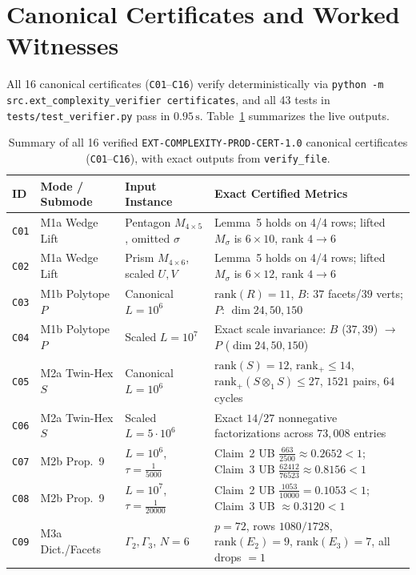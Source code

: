 \documentclass[10pt,twocolumn]{article}
\begin{document}
\section{Canonical Certificates and Worked Witnesses}
All 16 canonical certificates (\texttt{C01}--\texttt{C16}) verify deterministically via \nolinkurl{python -m src.ext_complexity_verifier certificates}, and all 43 tests in \nolinkurl{tests/test_verifier.py} pass in $0.95\,\mathrm{s}$. Table~\ref{tab:certs} summarizes the live outputs.

\begin{table}[t]
\centering
\scriptsize
\setlength{\tabcolsep}{4.0pt}
\caption{Summary of all 16 verified \texttt{EXT-COMPLEXITY-PROD-CERT-1.0} canonical certificates (\texttt{C01}--\texttt{C16}), with exact outputs from \texttt{verify\_file}.}
\label{tab:certs}
\begin{tabular}{@{}llll@{}}
\toprule
ID & Mode / Submode & Input Instance & Exact Certified Metrics \\
\midrule
\texttt{C01} & M1a Wedge Lift & Pentagon $M_{4\times 5}$, omitted $\sigma$ & Lemma~5 holds on 4/4 rows; lifted $M_\sigma$ is $6\times 10$, rank $4\to 6$ \\
\texttt{C02} & M1a Wedge Lift & Prism $M_{4\times 6}$, scaled $U,V$ & Lemma~5 holds on 4/4 rows; lifted $M_\sigma$ is $6\times 12$, rank $4\to 6$ \\
\texttt{C03} & M1b Polytope $P$ & Canonical $L=10^6$ & $\mathrm{rank}(R)=11$, $B$: $37$ facets/$39$ verts; $P$: $\dim 24, 50, 150$ \\
\texttt{C04} & M1b Polytope $P$ & Scaled $L=10^7$ & Exact scale invariance: $B$ ($37,39$) $\to$ $P$ ($\dim 24, 50, 150$) \\
\texttt{C05} & M2a Twin-Hex $S$ & Canonical $L=10^6$ & $\mathrm{rank}(S)=12$, $\mathrm{rank}_+\le 14$, $\mathrm{rank}_+(S\otimes_1 S)\le 27$, $1521$ pairs, $64$ cycles \\
\texttt{C06} & M2a Twin-Hex $S$ & Scaled $L=5\cdot 10^6$ & Exact $14$/$27$ nonnegative factorizations across $73{,}008$ entries \\
\texttt{C07} & M2b Prop.~9 & $L=10^6$, $\tau=\tfrac{1}{5000}$ & Claim~2 UB $\tfrac{663}{2500}\approx 0.2652<1$; Claim~3 UB $\tfrac{62412}{76523}\approx 0.8156<1$ \\
\texttt{C08} & M2b Prop.~9 & $L=10^7$, $\tau=\tfrac{1}{20000}$ & Claim~2 UB $\tfrac{1053}{10000}=0.1053<1$; Claim~3 UB $\approx 0.3120<1$ \\
\texttt{C09} & M3a Dict./Facets & $\Gamma_2, \Gamma_3$, $N=6$ & $p=72$, rows $1080/1728$, $\mathrm{rank}(E_2)=9$, $\mathrm{rank}(E_3)=7$, all drops $=1$ \\

\end{tabular}
\end{table}
\end{document}
